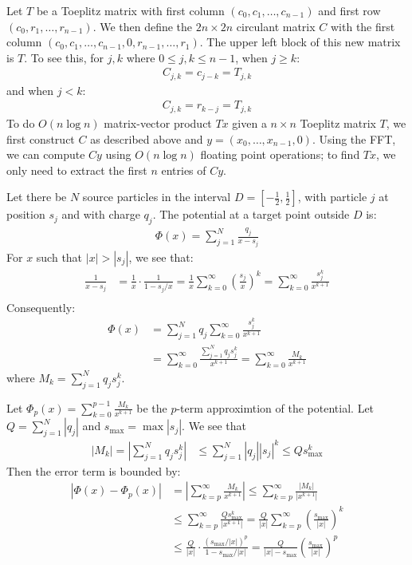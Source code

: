 \documentclass{article}
\begin{document}
Let $T$ be a Toeplitz matrix with first column $(c_0, c_1, \ldots, c_{n-1})$ and first row $(c_0, r_1, \ldots, r_{n-1})$. We then define the $2n \times 2n$ circulant matrix $C$ with the first column $(c_0, c_1, \ldots, c_{n-1}, 0, r_{n-1}, \ldots, r_1)$. The upper left block of this new matrix is $T$. To see this, for $j, k$ where $0 \leq j, k \leq n - 1$, when $j \geq k$:
\begin{align*}
    C_{j,k} = c_{j-k} = T_{j,k}
\end{align*}
and when $j < k$:
\begin{align*}
    C_{j,k} = r_{k-j} = T_{j,k}
\end{align*}
To do $O(n \log n)$ matrix-vector product $Tx$ given a $n \times n$ Toeplitz matrix $T$, we first construct $C$ as described above and $y = (x_0, \ldots, x_{n-1}, 0)$. Using the FFT, we can compute $Cy$ using $O(n \log n)$ floating point operations; to find $Tx$, we only need to extract the first $n$ entries of $Cy$.

\clearpage
\problem{}
Let there be $N$ source particles in the interval $D = [-\frac{1}{2}, \frac{1}{2}]$, with particle $j$ at position $s_j$ and with charge $q_j$. The potential at a target point outside $D$ is:
\begin{align*}
    \Phi(x) = \sum_{j=1}^N \frac{q_j}{x - s_j}
\end{align*}
For $x$ such that $|x| > |s_j|$, we see that:
\begin{align*}
    \frac{1}{x - s_j} & = \frac{1}{x} \cdot \frac{1}{1 - s_j/x} = \frac{1}{x} \sum_{k=0}^\infty \left(\frac{s_j}{x}\right)^k = \sum_{k=0}^\infty \frac{s_j^k}{x^{k+1}} \\
\end{align*}
Consequently:
\begin{align*}
    \Phi(x) & = \sum_{j=1}^N q_j\sum_{k=0}^\infty \frac{s_j^k}{x^{k+1}} \\
    & = \sum_{k=0}^\infty \frac{\sum_{j=1}^N q_j s_j^k}{x^{k+1}} = \sum_{k=0}^\infty \frac{M_k}{x^{k+1}}
\end{align*}
where $M_k = \sum_{j=1}^N q_j s_j^k$.

Let $\Phi_p(x) = \sum_{k=0}^{p-1} \frac{M_k}{x^{k+1}}$ be the $p$-term approximtion of the potential. Let $Q = \sum_{j=1}^N |q_j|$ and $s_{\text{max}} = \max |s_j|$. We see that
\begin{align*}
    |M_k| = \left|\sum_{j=1}^N q_j s_j^k\right| & \leq \sum_{j=1}^N |q_j| |s_j|^k \leq Qs_{\text{max}}^k
\end{align*}
Then the error term is bounded by:
\begin{align*}
    |\Phi(x) - \Phi_p(x)| & = \left| \sum_{k=p}^\infty \frac{M_k}{x^{k+1}} \right| \leq \sum_{k=p}^\infty \frac{|M_k|}{|x^{k+1}|} \\
    & \leq \sum_{k=p}^\infty \frac{Qs_{\text{max}}^k}{|x^{k+1}|} = \frac{Q}{|x|} \sum_{k=p}^\infty \left(\frac{s_{\text{max}}}{|x|}\right)^k \\
    & \leq \frac{Q}{|x|} \cdot \frac{(s_{\text{max}}/|x|)^p}{1 - s_{\text{max}}/|x|} = \frac{Q}{|x| - s_{\text{max}}}\left(\frac{s_{\text{max}}}{|x|}\right)^p
\end{align*}
\end{document}
